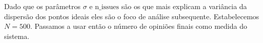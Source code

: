 Dado que os parâmetros \(\sigma\) e \(\text{n\_issues}\) são os que mais explicam a
variância da dispersão dos pontos ideais eles são o foco de análise subsequente.
Estabelecemos \(N = 500\). Passamos a usar então o número de opiniões finais
como medida do sistema.





